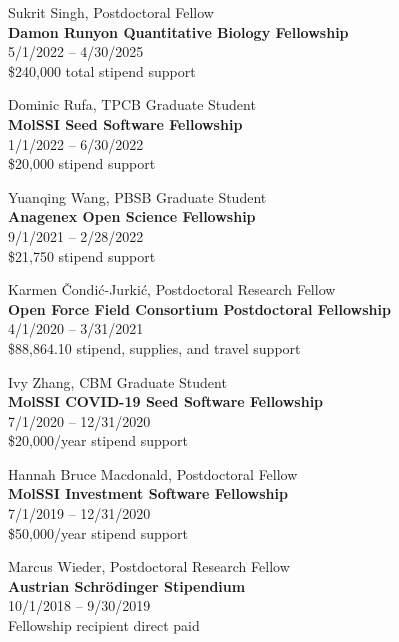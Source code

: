 \documentclass[10pt]{article}
\begin{document}
Sukrit Singh, Postdoctoral Fellow \\
{\bf Damon Runyon Quantitative Biology Fellowship}\\
5/1/2022 -- 4/30/2025\\
\$240,000 total stipend support

\vspace{1.5ex} 

Dominic Rufa, TPCB Graduate Student\\
{\bf MolSSI Seed Software Fellowship}\\
1/1/2022 -- 6/30/2022\\
\$20,000 stipend support

\vspace{1.5ex} 

Yuanqing Wang, PBSB Graduate Student\\
{\bf Anagenex Open Science Fellowship}\\
9/1/2021 -- 2/28/2022\\
\$21,750 stipend support

\vspace{1.5ex} 

Karmen \v{C}ondi\'{c}-Jurki\'{c}, Postdoctoral Research Fellow\\
{\bf Open Force Field Consortium Postdoctoral Fellowship}\\
4/1/2020 -- 3/31/2021\\
\$88,864.10 stipend, supplies, and travel support

\vspace{1.5ex}

Ivy Zhang, CBM Graduate Student\\
{\bf MolSSI COVID-19 Seed Software Fellowship}\\
7/1/2020 -- 12/31/2020\\
\$20,000/year stipend support

\vspace{1.5ex}

Hannah Bruce Macdonald, Postdoctoral Fellow\\
{\bf MolSSI Investment Software Fellowship}\\
7/1/2019 -- 12/31/2020\\
\$50,000/year stipend support

\vspace{1.5ex}

Marcus Wieder, Postdoctoral Research Fellow\\
{\bf Austrian Schr\"{o}dinger Stipendium}\\
10/1/2018 -- 9/30/2019\\
Fellowship recipient direct paid
\end{document}
